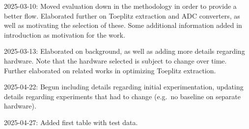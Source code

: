 2025-03-10: Moved evaluation down in the methodology in order to provide a better flow. Elaborated further on Toeplitz extraction and ADC converters, as well as motivating the selection of these. Some additional information added in introduction as motivation for the work.

2025-03-13: Elaborated on background, as well as adding more details regarding hardware. Note that the hardware selected is subject to change over time. Further elaborated on related works in optimizing Toeplitz extraction.

2025-04-22: Begun including details regarding initial experimentation, updating details regarding experiments that had to change (e.g.~no baseline on separate hardware).

2025-04-27: Added first table with test data.
